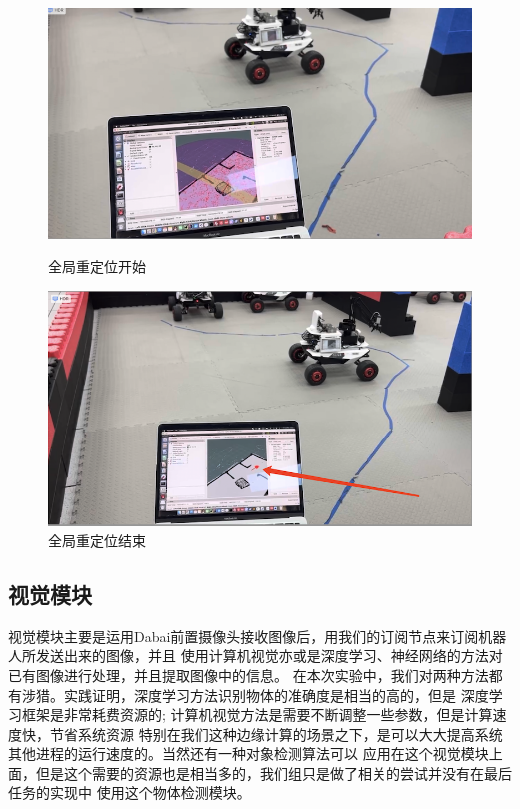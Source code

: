\documentclass[a4paper,twoside]{article}
\begin{document}
\begin{figure}[htbp]
	\centering
	\begin{minipage}{0.49\linewidth}
		\centering
		\includegraphics[width=1.0\linewidth]{compassbegin.png}
		\caption{全局重定位开始}
	\end{minipage}
	\begin{minipage}{0.49\linewidth}
		\centering
		\includegraphics[width=1.0\linewidth]{compassend.png}
		\caption{全局重定位结束}
	\end{minipage}
\end{figure}

\subsection{视觉模块}
视觉模块主要是运用Dabai前置摄像头接收图像后，用我们的订阅节点来订阅机器人所发送出来的图像，并且
使用计算机视觉亦或是深度学习、神经网络的方法对已有图像进行处理，并且提取图像中的信息。
在本次实验中，我们对两种方法都有涉猎。实践证明，深度学习方法识别物体的准确度是相当的高的，但是
深度学习框架是非常耗费资源的; 计算机视觉方法是需要不断调整一些参数，但是计算速度快，节省系统资源
特别在我们这种边缘计算的场景之下，是可以大大提高系统其他进程的运行速度的。当然还有一种对象检测算法可以
应用在这个视觉模块上面，但是这个需要的资源也是相当多的，我们组只是做了相关的尝试并没有在最后任务的实现中
使用这个物体检测模块。
\end{document}
